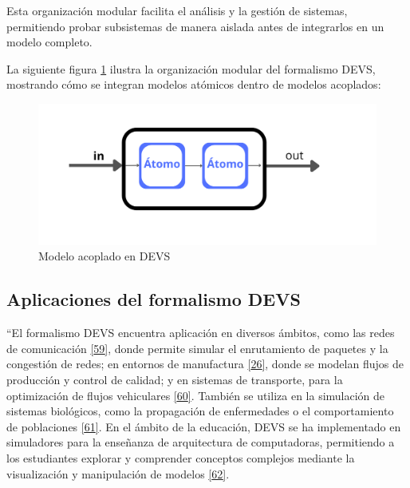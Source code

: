 \documentclass[12pt,oneside]{templates/unerthesis}
\begin{document}
Esta organización modular facilita el análisis y la gestión de sistemas, permitiendo probar subsistemas de manera aislada antes de integrarlos en un modelo completo.

La siguiente figura \ref{fig:acoplado} ilustra la organización modular del formalismo DEVS, mostrando cómo se integran modelos atómicos dentro de modelos acoplados:

\begin{figure}

{\centering \includegraphics[width=1\linewidth]{images/acoplado} 

}

\caption{Modelo acoplado en DEVS}\label{fig:acoplado}
\end{figure}

\hypertarget{aplicaciones-del-formalismo-devs}{%
\subsection{Aplicaciones del formalismo DEVS}\label{aplicaciones-del-formalismo-devs}}

``El formalismo DEVS encuentra aplicación en diversos ámbitos, como las redes de comunicación \protect\hyperlink{ref-fujimoto2001parallel}{{[}59{]}}, donde permite simular el enrutamiento de paquetes y la congestión de redes; en entornos de manufactura \protect\hyperlink{ref-zeigler_theory_2000}{{[}26{]}}, donde se modelan flujos de producción y control de calidad; y en sistemas de transporte, para la optimización de flujos vehiculares \protect\hyperlink{ref-barros1997modeling}{{[}60{]}}. También se utiliza en la simulación de sistemas biológicos, como la propagación de enfermedades o el comportamiento de poblaciones \protect\hyperlink{ref-zeigler2004continuity}{{[}61{]}}. En el ámbito de la educación, DEVS se ha implementado en simuladores para la enseñanza de arquitectura de computadoras, permitiendo a los estudiantes explorar y comprender conceptos complejos mediante la visualización y manipulación de modelos \protect\hyperlink{ref-calvo2010simulador}{{[}62{]}}.
\end{document}
